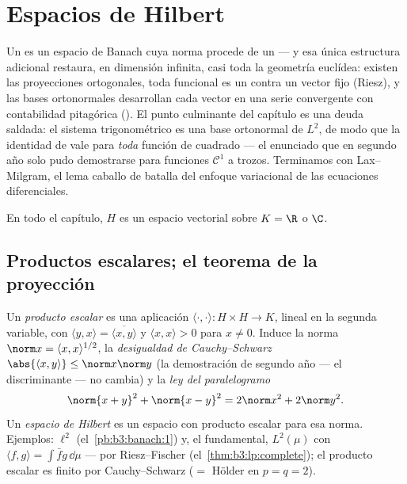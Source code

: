 \chapter{Espacios de Hilbert}\label{ch:b3:hilbert}

Un  es un espacio de
Banach cuya norma procede de un  --- y esa única estructura adicional restaura, en dimensión
infinita, casi toda la geometría euclídea: existen las proyecciones
ortogonales, toda funcional
 es un
 contra un vector fijo
(Riesz), y las bases ortonormales desarrollan cada vector en una serie
convergente con contabilidad pitagórica
(). El punto culminante del
capítulo es una deuda saldada: el sistema trigonométrico es una base
ortonormal de $L^2$, de modo que la identidad de
 vale para \emph{toda} función
de cuadrado  --- el enunciado que
en segundo año solo pudo demostrarse para funciones $\mathcal C^1$ a
trozos. Terminamos con Lax--Milgram, el lema caballo de batalla del
enfoque variacional de las ecuaciones diferenciales.

En todo el capítulo, $H$ es un espacio vectorial sobre $K = \R$ o $\C$.

\section{Productos escalares; el teorema de la proyección}

\begin{definition}\label{def:b3:hilbert:inner}
Un \emph{producto escalar} es una aplicación
$\langle
\cdot,\cdot\rangle \colon H\times H \to K$, lineal en la segunda
variable, con $\langle y, x\rangle =
\overline{\langle x, y\rangle}$ y $\langle x, x\rangle > 0$ para
$x \neq 0$. Induce la norma $\norm x = \langle x,
x\rangle^{1/2}$, la \emph{desigualdad de Cauchy--Schwarz}
$\abs{\langle x, y\rangle} \leq \norm x\norm y$ (la demostración de
segundo año --- el discriminante --- no cambia) y la \emph{ley del
paralelogramo}
\[
\norm{x + y}^2 + \norm{x - y}^2 = 2\norm x^2 + 2\norm y^2 .
\]
Un \emph{espacio de Hilbert} es un espacio con
producto escalar  para esa
norma. Ejemplos: $\ell^2$ (el~\cref{pb:b3:banach:1}) y, el fundamental,
$L^2(\mu)$ con $\langle f, g\rangle = \int\bar fg\,\dd\mu$ ---
 por Riesz--Fischer
(el~\cref{thm:b3:lp:complete}); el producto escalar es finito por
Cauchy--Schwarz ($= $ Hölder en
$p = q = 2$).
\end{definition}

